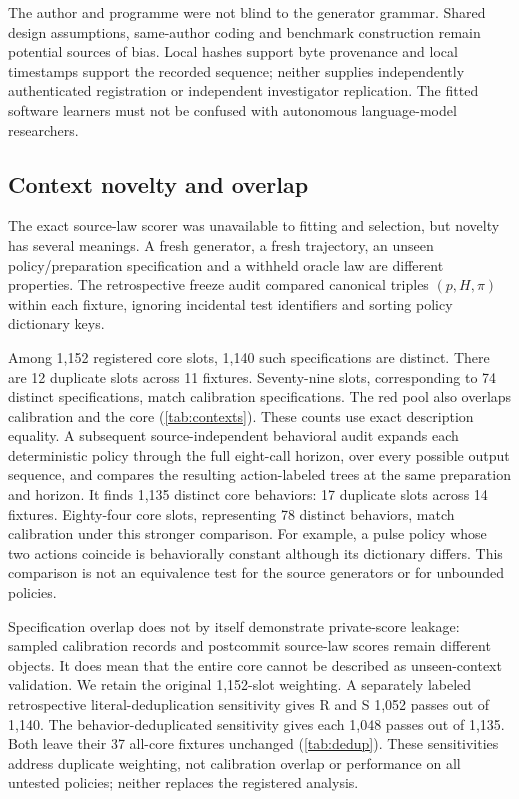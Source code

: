 The author and programme were not blind to the generator grammar. Shared design assumptions, same-author coding and benchmark construction remain potential sources of bias. Local hashes support byte provenance and local timestamps support the recorded sequence; neither supplies independently authenticated registration or independent investigator replication. The fitted software learners must not be confused with autonomous language-model researchers.

\subsection{Context novelty and overlap}\label{sec:coverage}\label{p3:c19}
The exact source-law scorer was unavailable to fitting and selection, but novelty has several meanings. A fresh generator, a fresh trajectory, an unseen policy/preparation specification and a withheld oracle law are different properties. The retrospective freeze audit compared canonical triples $(p,H,\pi)$ within each fixture, ignoring incidental test identifiers and sorting policy dictionary keys.

Among 1,152 registered core slots, 1,140 such specifications are distinct. There are 12 duplicate slots across 11 fixtures. Seventy-nine slots, corresponding to 74 distinct specifications, match calibration specifications. The red pool also overlaps calibration and the core (\cref{tab:contexts}). These counts use exact description equality. A subsequent source-independent behavioral audit expands each deterministic policy through the full eight-call horizon, over every possible output sequence, and compares the resulting action-labeled trees at the same preparation and horizon. It finds 1,135 distinct core behaviors: 17 duplicate slots across 14 fixtures. Eighty-four core slots, representing 78 distinct behaviors, match calibration under this stronger comparison. For example, a pulse policy whose two actions coincide is behaviorally constant although its dictionary differs. This comparison is not an equivalence test for the source generators or for unbounded policies.

Specification overlap does not by itself demonstrate private-score leakage: sampled calibration records and postcommit source-law scores remain different objects. It does mean that the entire core cannot be described as unseen-context validation. We retain the original 1,152-slot weighting. A separately labeled retrospective literal-deduplication sensitivity gives R and S 1,052 passes out of 1,140. The behavior-deduplicated sensitivity gives each 1,048 passes out of 1,135. Both leave their 37 all-core fixtures unchanged (\cref{tab:dedup}). These sensitivities address duplicate weighting, not calibration overlap or performance on all untested policies; neither replaces the registered analysis.


